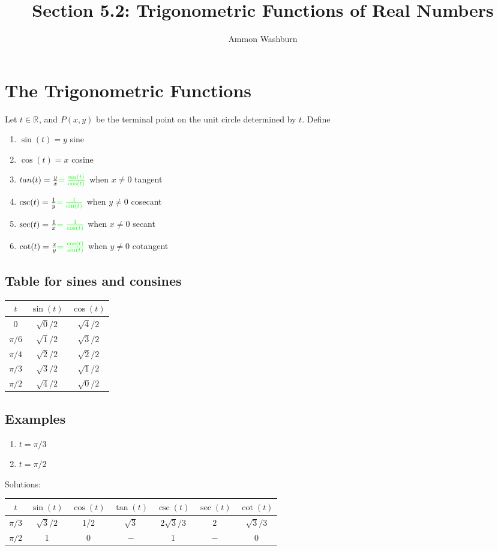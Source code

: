 \documentclass{tufte-handout}
\title{Section 5.2: Trigonometric Functions of Real Numbers}
\author[AW]{Ammon Washburn}
\newcommand{\R}[1]{\mathbb{R}^{#1}}
\begin{document}
\section{The Trigonometric Functions}
Let $t \in \R{}$, and $P(x, y)$ be the terminal point on the unit circle determined by $t$. 
Define
\begin{enumerate}
\item $\sin(t) = y$ {\color{blue} sine}
\item $\cos(t) = x$ {\color{blue} cosine}
\item $tan(t) = \frac{y}{x} {\color{green} = \frac{\sin(t)}{\cos(t)}}$ when $x \not= 0$ {\color{blue} tangent} 
\item $\csc(t) = \frac{1}{y} {\color{green} = \frac{1}{\sin(t)}}$ when $y \not= 0$ {\color{blue} cosecant}
\item $\sec(t) = \frac{1}{x} {\color{green} = \frac{1}{\cos(t)}}$ when $x \not= 0$ {\color{blue} secant}
\item $\cot(t) = \frac{x}{y} {\color{green} = \frac{\cos(t)}{\sin(t)}}$ when $y \not= 0$ {\color{blue} cotangent}
\end{enumerate}

\subsection{Table for sines and consines}
\begin{tabular}{c|c|c}
$t$ & $\sin(t)$ & $\cos(t)$ \\ \hline
$0$     & $\sqrt{0}/2$ & $\sqrt{4}/2$ \\
$\pi/6$ & $\sqrt{1}/2$ & $\sqrt{3}/2$ \\
$\pi/4$ & $\sqrt{2}/2$ & $\sqrt{2}/2$ \\
$\pi/3$ & $\sqrt{3}/2$ & $\sqrt{1}/2$ \\
$\pi/2$ & $\sqrt{4}/2$ & $\sqrt{0}/2$
\end{tabular}

\subsection{Examples}
\begin{enumerate}
\item $t = \pi/3$
\item $t = \pi/2$
\end{enumerate}
{\color{blue} Solutions:
\begin{tabular}{c|c|c|c|c|c|c}
$t$ & $\sin(t)$ & $\cos(t)$ & $\tan(t)$ & $\csc(t)$ & $\sec(t)$ & $\cot(t)$ \\ \hline
$\pi/3$ & $\sqrt{3}/2$ & 1/2 & $\sqrt{3}$ & $2\sqrt{3}/3$ & $2$ & $\sqrt{3}/3$ \\
$\pi/2$ & 1 & 0 & $-$ & 1 & $-$ & 0
\end{tabular}
}
\end{document}
